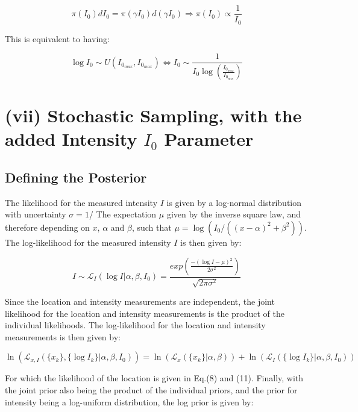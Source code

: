 \documentclass[12pt]{report} %
\begin{document}
\begin{equation}
    \pi(I_{0}) dI_{0} = \pi(\gamma I_{0}) d(\gamma I_{0}) \Rightarrow \pi(I_{0}) \propto \frac{1}{I_{0}}
\end{equation}

This is equivalent to having:

\begin{equation}
    \log I_{0} \sim U(I_{0_{max}}, I_{0_{max}})  \iff I_{0} \sim \frac{1}{I_{0} \log(\frac{I_{0_{max}}}{I_{0_{min}}})}
\end{equation}


\chapter{(vii) Stochastic Sampling, with the added Intensity $I_{0}$ Parameter}


\section{Defining the Posterior}

The likelihood for the measured intensity $I$ is given by a log-normal distribution with uncertainty $\sigma = 1$/ The expectation $\mu$ given by the inverse square law, and therefore depending on $x$, $\alpha$ and $\beta$, such that $\mu = \log(I_{0}/((x - \alpha)^{2} + \beta^{2}))$. The log-likelihood for the measured intensity $I$ is then given by:

\begin{equation}
    I \sim \mathcal{L}_{I}(\log I | \alpha, \beta, I_{0}) = \frac{exp(\frac{-(\log I - \mu)^{2}}{2\sigma^{2}})}{\sqrt{2\pi\sigma^{2}}}
\end{equation}

Since the location and intensity measurements are independent, the joint likelihood for the location and intensity measurements is the product of the individual likelihoods. The log-likelihood for the location and intensity measurements is then given by:

\begin{equation}
    \ln(\mathcal{L}_{x, I}(\{x_{k}\}, \{\log I_{k}\} | \alpha, \beta, I_{0})) = \ln(\mathcal{L}_{x}(\{x_{k}\} | \alpha, \beta)) + \ln(\mathcal{L}_{I}(\{\log I_{k}\} | \alpha, \beta, I_{0}))
\end{equation}

For which the likelihood of the location is given in Eq.(8) and (11). Finally, with the joint prior also being the product of the individual priors, and the prior for intensity being a log-uniform distribution, the log prior is given by:
\end{document}

